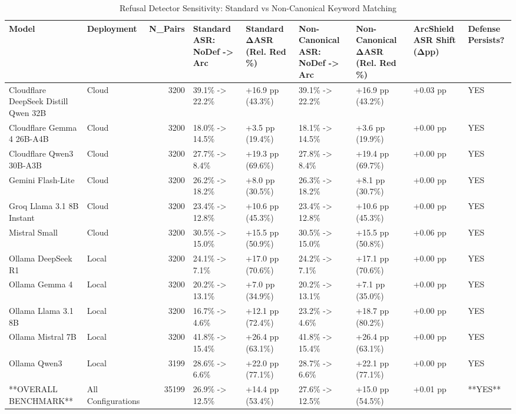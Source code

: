 \begin{table}[t]
\centering
\caption{Refusal Detector Sensitivity: Standard vs Non-Canonical Keyword Matching}
\begin{tabular}{llrllllll}
\toprule
Model & Deployment & N\_Pairs & Standard ASR: NoDef -> Arc & Standard ΔASR (Rel. Red \%) & Non-Canonical ASR: NoDef -> Arc & Non-Canonical ΔASR (Rel. Red \%) & ArcShield ASR Shift (Δpp) & Defense Persists? \\
\midrule
Cloudflare DeepSeek Distill Qwen 32B & Cloud & 3200 & 39.1\% -> 22.2\% & +16.9 pp (43.3\%) & 39.1\% -> 22.2\% & +16.9 pp (43.2\%) & +0.03 pp & YES \\
Cloudflare Gemma 4 26B-A4B & Cloud & 3200 & 18.0\% -> 14.5\% & +3.5 pp (19.4\%) & 18.1\% -> 14.5\% & +3.6 pp (19.9\%) & +0.00 pp & YES \\
Cloudflare Qwen3 30B-A3B & Cloud & 3200 & 27.7\% -> 8.4\% & +19.3 pp (69.6\%) & 27.8\% -> 8.4\% & +19.4 pp (69.7\%) & +0.00 pp & YES \\
Gemini Flash-Lite & Cloud & 3200 & 26.2\% -> 18.2\% & +8.0 pp (30.5\%) & 26.3\% -> 18.2\% & +8.1 pp (30.7\%) & +0.00 pp & YES \\
Groq Llama 3.1 8B Instant & Cloud & 3200 & 23.4\% -> 12.8\% & +10.6 pp (45.3\%) & 23.4\% -> 12.8\% & +10.6 pp (45.3\%) & +0.00 pp & YES \\
Mistral Small & Cloud & 3200 & 30.5\% -> 15.0\% & +15.5 pp (50.9\%) & 30.5\% -> 15.0\% & +15.5 pp (50.8\%) & +0.06 pp & YES \\
Ollama DeepSeek R1 & Local & 3200 & 24.1\% -> 7.1\% & +17.0 pp (70.6\%) & 24.2\% -> 7.1\% & +17.1 pp (70.6\%) & +0.00 pp & YES \\
Ollama Gemma 4 & Local & 3200 & 20.2\% -> 13.1\% & +7.0 pp (34.9\%) & 20.2\% -> 13.1\% & +7.1 pp (35.0\%) & +0.00 pp & YES \\
Ollama Llama 3.1 8B & Local & 3200 & 16.7\% -> 4.6\% & +12.1 pp (72.4\%) & 23.2\% -> 4.6\% & +18.7 pp (80.2\%) & +0.00 pp & YES \\
Ollama Mistral 7B & Local & 3200 & 41.8\% -> 15.4\% & +26.4 pp (63.1\%) & 41.8\% -> 15.4\% & +26.4 pp (63.1\%) & +0.00 pp & YES \\
Ollama Qwen3 & Local & 3199 & 28.6\% -> 6.6\% & +22.0 pp (77.1\%) & 28.7\% -> 6.6\% & +22.1 pp (77.1\%) & +0.00 pp & YES \\
**OVERALL BENCHMARK** & All Configurations & 35199 & 26.9\% -> 12.5\% & +14.4 pp (53.4\%) & 27.6\% -> 12.5\% & +15.0 pp (54.5\%) & +0.01 pp & **YES** \\
\bottomrule
\end{tabular}

\end{table}

